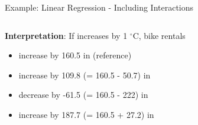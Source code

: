 \documentclass[11pt,compress,t,notes=noshow, aspectratio=169, xcolor=table]{beamer}
\begin{document}
\begin{frame}{Example: Linear Regression - Including Interactions}
\begin{columns}[T, totalwidth=\linewidth]
\end{columns}
\vfill
\pause
\textbf{Interpretation}: If  increases by 1 $^{\circ}$C, bike rentals
\begin{itemize}[<+->]
    \item increase by 160.5 in  (reference)
    \item increase by 109.8 (= 160.5 - 50.7) in 
    \item decrease by -61.5 (= 160.5 - 222) in 
    \item increase by 187.7 (= 160.5 + 27.2) in 
\end{itemize} %
\end{frame}
\end{document}

